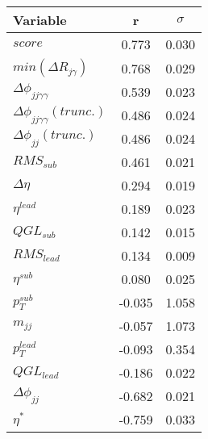\documentclass{article}
\begin{document}
\begin{center}
\begin{tabular}{| l || c | c |}
\hline
Variable & r & $\sigma$ \\ \hline
$score$ & 0.773 & 0.030 \\ 
$min(\Delta{R}_{j\gamma})$ & 0.768 & 0.029 \\ 
$\Delta\phi_{jj\gamma\gamma}$ & 0.539 & 0.023 \\ 
$\Delta\phi_{jj\gamma\gamma}(trunc.)$ & 0.486 & 0.024 \\ 
$\Delta\phi_{jj}(trunc.)$ & 0.486 & 0.024 \\ 
$RMS_{sub}$ & 0.461 & 0.021 \\ 
$\Delta\eta$ & 0.294 & 0.019 \\ 
$\eta^{lead}$ & 0.189 & 0.023 \\ 
$QGL_{sub}$ & 0.142 & 0.015 \\ 
$RMS_{lead}$ & 0.134 & 0.009 \\ 
$\eta^{sub}$ & 0.080 & 0.025 \\ 
$p_{T}^{sub}$ & -0.035 & 1.058 \\ 
$m_{jj}$ & -0.057 & 1.073 \\ 
$p_{T}^{lead}$ & -0.093 & 0.354 \\ 
$QGL_{lead}$ & -0.186 & 0.022 \\ 
$\Delta\phi_{jj}$ & -0.682 & 0.021 \\ 
$\eta^{*}$ & -0.759 & 0.033 \\ 
\hline
\end{tabular}
\end{center}
\end{document}
